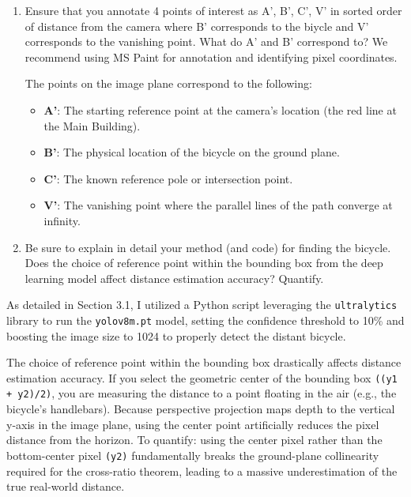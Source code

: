 \begin{enumerate}
\item Ensure that you annotate 4 points of interest as A', B', C', V'  in sorted order of distance from the camera where B' corresponds to the biycle and V' corresponds to the vanishing point.
What do A' and B' correspond to?
We recommend using MS Paint for annotation and identifying pixel coordinates.
\begin{studentSpace}
The points on the image plane correspond to the following:
\begin{itemize}
    \item \textbf{A'}: The starting reference point at the camera's location (the red line at the Main Building).
    \item \textbf{B'}: The physical location of the bicycle on the ground plane.
    \item \textbf{C'}: The known reference pole or intersection point.
    \item \textbf{V'}: The vanishing point where the parallel lines of the path converge at infinity.
\end{itemize}
\end{studentSpace}

\item Be sure to  explain in detail your method (and code) for finding the bicycle.
Does the choice of reference point within the bounding box from the deep learning model affect distance estimation accuracy? Quantify.
\end{enumerate}
\begin{studentSpace}
As detailed in Section 3.1, I utilized a Python script leveraging the \texttt{ultralytics} library to run the \texttt{yolov8m.pt} model, setting the confidence threshold to 10\% and boosting the image size to 1024 to properly detect the distant bicycle.

The choice of reference point within the bounding box drastically affects distance estimation accuracy. If you select the geometric center of the bounding box \texttt{((y1 + y2)/2)}, you are measuring the distance to a point floating in the air (e.g., the bicycle's handlebars). Because perspective projection maps depth to the vertical y-axis in the image plane, using the center point artificially reduces the pixel distance from the horizon. To quantify: using the center pixel rather than the bottom-center pixel \texttt{(y2)} fundamentally breaks the ground-plane collinearity required for the cross-ratio theorem, leading to a massive underestimation of the true real-world distance.
\end{studentSpace}


